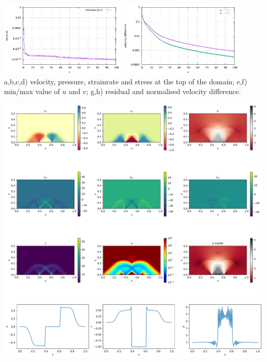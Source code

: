 \begin{center}
\includegraphics[width=6cm]{python_codes/fieldstone_08/results/rough/residual.pdf}
\includegraphics[width=6cm]{python_codes/fieldstone_08/results/rough/diff_uv.pdf}\\
{\captionfont a,b,c,d) velocity, pressure, strainrate and stress at the top of the domain; 
e,f) min/max value of $u$ and $v$;
g,h) residual and normalised velocity difference.}
\end{center}

\newpage
\includegraphics[width=16cm]{python_codes/fieldstone_08/results/rough/solution.pdf}


\newpage
